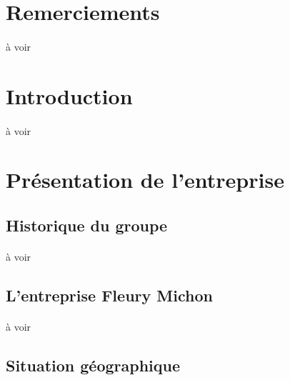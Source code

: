 \documentclass[a4paper,12pt]{extarticle}
\begin{document}
\clearpage

\tableofcontents

\clearpage

\section{Remerciements}

\paragraph{}
à voir\\

\clearpage

\section{Introduction}

\paragraph{}
à voir\\

\clearpage

\section{Présentation de l’entreprise}

\subsection{Historique du groupe}

\paragraph{}
à voir\\

\subsection{L’entreprise Fleury Michon}

\paragraph{}
à voir\\

\subsection{Situation géographique}
\end{document}
